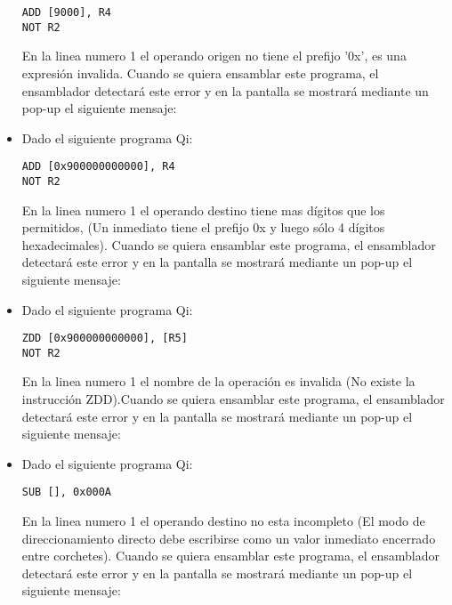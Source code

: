 \begin{itemize}
\begin{verbatim}
ADD [9000], R4
NOT R2
\end{verbatim}

En la linea numero 1 el operando origen no tiene el prefijo '0x', es una expresión invalida. Cuando se quiera ensamblar este programa, el ensamblador detectará este error y en la pantalla se mostrará mediante un pop-up el siguiente mensaje:


\item Dado el siguiente programa Qi:

\begin{verbatim}
ADD [0x900000000000], R4
NOT R2
\end{verbatim}

En la linea numero 1 el operando destino tiene mas dígitos que los permitidos, (Un inmediato tiene el prefijo 0x y luego sólo 4 dígitos hexadecimales). Cuando se quiera ensamblar este programa, el ensamblador detectará este error y en la pantalla se mostrará mediante un pop-up el siguiente mensaje:


\item Dado el siguiente programa Qi:

\begin{verbatim}
ZDD [0x900000000000], [R5]
NOT R2
\end{verbatim}

En la linea numero 1 el nombre de la operación es invalida (No existe la instrucción ZDD).Cuando se quiera ensamblar este programa, el ensamblador detectará este error y en la pantalla se mostrará mediante un pop-up el siguiente mensaje:


\item Dado el siguiente programa Qi:

\begin{verbatim}
SUB [], 0x000A
\end{verbatim}

En la linea numero 1 el operando destino no esta incompleto (El modo de direccionamiento directo debe escribirse como un valor inmediato encerrado entre corchetes). Cuando se quiera ensamblar este programa, el ensamblador detectará este error y en la pantalla se mostrará mediante un pop-up el siguiente mensaje:


\end{itemize}
